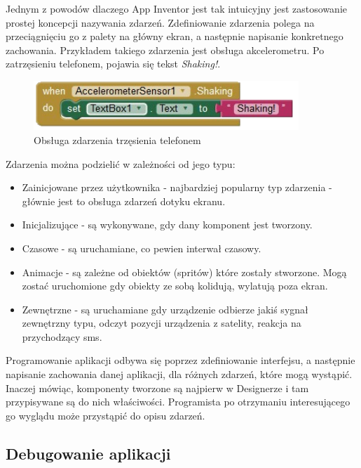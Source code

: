 Jednym z powodów dlaczego App Inventor jest tak intuicyjny jest zastosowanie prostej koncepcji nazywania zdarzeń. Zdefiniowanie zdarzenia polega na przeciągnięciu go z palety na główny ekran, a następnie napisanie konkretnego zachowania. Przykładem takiego zdarzenia jest obsługa akcelerometru. Po zatrzęsieniu telefonem, pojawia się tekst \emph{Shaking!}.

\begin{figure}[th] 
\centering\includegraphics[width=10cm]{figures/shakingEvent}
\caption{Obsługa zdarzenia trzęsienia telefonem}
\end{figure}

Zdarzenia można podzielić w zależności od jego typu:
\begin{itemize}
\item Zainicjowane przez użytkownika - najbardziej popularny typ zdarzenia - głównie jest to obsługa zdarzeń dotyku ekranu.
\item Inicjalizujące - są wykonywane, gdy dany komponent jest tworzony.
\item Czasowe - są uruchamiane, co pewien interwał czasowy.
\item Animacje - są zależne od obiektów (spritów) które zostały stworzone. Mogą zostać uruchomione gdy obiekty ze sobą kolidują, wylatują poza ekran.
\item Zewnętrzne - są uruchamiane gdy urządzenie odbierze jakiś sygnał zewnętrzny typu, odczyt pozycji urządzenia z satelity, reakcja na przychodzący sms.
\end{itemize}

Programowanie aplikacji odbywa się poprzez zdefiniowanie interfejsu, a następnie napisanie zachowania danej aplikacji, dla różnych zdarzeń, które mogą wystąpić. Inaczej mówiąc, komponenty tworzone są najpierw w Designerze i tam przypisywane są do nich właściwości. Programista po otrzymaniu interesującego go wyglądu może przystąpić do opisu zdarzeń.

\subsection{Debugowanie aplikacji}
\label{c33}

